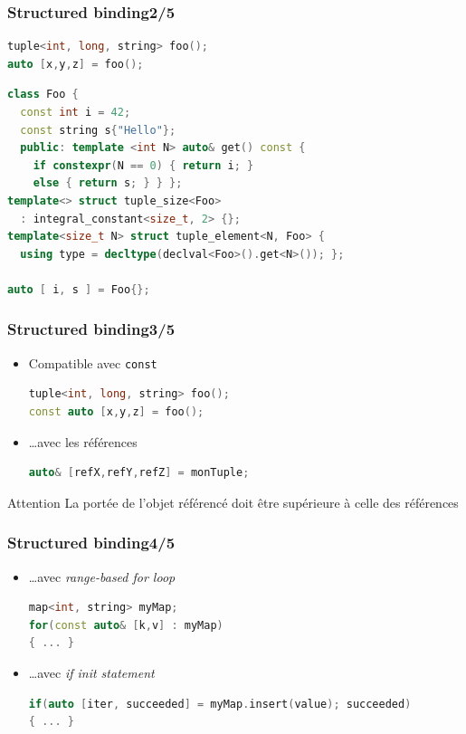 \documentclass[C++.tex]{subfiles}
\begin{document}
\begin{frame}[fragile]
	\frametitle{Structured binding\titlehfill{}2/5}
	\begin{lstlisting}[language=C++]
tuple<int, long, string> foo();
auto [x,y,z] = foo();\end{lstlisting}

	\begin{lstlisting}[language=C++]
class Foo {
  const int i = 42;
  const string s{"Hello"}; 
  public: template <int N> auto& get() const {
    if constexpr(N == 0) { return i; }
    else { return s; } } };
template<> struct tuple_size<Foo>
  : integral_constant<size_t, 2> {};
template<size_t N> struct tuple_element<N, Foo> {
  using type = decltype(declval<Foo>().get<N>()); };

auto [ i, s ] = Foo{};\end{lstlisting}

\end{frame}

\begin{frame}[fragile]
	\frametitle{Structured binding\titlehfill{}3/5}
	\begin{itemize}
		\item Compatible avec \lstinline|const|

		\begin{lstlisting}[language=C++]
tuple<int, long, string> foo();
const auto [x,y,z] = foo();\end{lstlisting}

		\item \ldots{}avec les références

		\begin{lstlisting}[language=C++]
auto& [refX,refY,refZ] = monTuple;\end{lstlisting}
	\end{itemize}

	\begin{alertblock}{Attention}
		La portée de l'objet référencé doit être supérieure à celle des références
	\end{alertblock}

\end{frame}

\begin{frame}[fragile]
	\frametitle{Structured binding\titlehfill{}4/5}
	\begin{itemize}
		\item \ldots{}avec \textit{range-based for loop}

		\begin{lstlisting}[language=C++]
map<int, string> myMap;    
for(const auto& [k,v] : myMap) 
{ ... } \end{lstlisting}

		\item \ldots{}avec \textit{if init statement}

		\begin{lstlisting}[language=C++]
if(auto [iter, succeeded] = myMap.insert(value); succeeded)
{ ... }\end{lstlisting}
	\end{itemize}
\end{frame}
\end{document}
